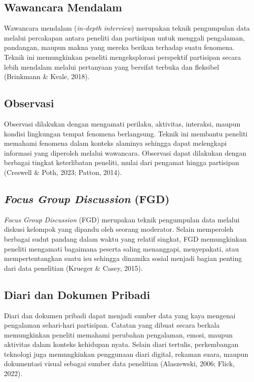 \documentclass[
  indonesian,
  letterpaper,
  DIV=11,
  numbers=noendperiod]{scrreprt}
\begin{document}
\subsection{Wawancara Mendalam}\label{wawancara-mendalam}

Wawancara mendalam (\emph{in-depth interview}) merupakan teknik
pengumpulan data melalui percakapan antara peneliti dan partisipan untuk
menggali pengalaman, pandangan, maupun makna yang mereka berikan
terhadap suatu fenomena. Teknik ini memungkinkan peneliti mengeksplorasi
perspektif partisipan secara lebih mendalam melalui pertanyaan yang
bersifat terbuka dan fleksibel (Brinkmann \& Kvale, 2018).

\subsection{Observasi}\label{observasi}

Observasi dilakukan dengan mengamati perilaku, aktivitas, interaksi,
maupun kondisi lingkungan tempat fenomena berlangsung. Teknik ini
membantu peneliti memahami fenomena dalam konteks alaminya sehingga
dapat melengkapi informasi yang diperoleh melalui wawancara. Observasi
dapat dilakukan dengan berbagai tingkat keterlibatan peneliti, mulai
dari pengamat hingga partisipan (Creswell \& Poth, 2023; Patton, 2014).

\subsection{\texorpdfstring{\emph{Focus Group Discussion}
(FGD)}{Focus Group Discussion (FGD)}}\label{focus-group-discussion-fgd}

\emph{Focus Group Discussion} (FGD) merupakan teknik pengumpulan data
melalui diskusi kelompok yang dipandu oleh seorang moderator. Selain
memperoleh berbagai sudut pandang dalam waktu yang relatif singkat, FGD
memungkinkan peneliti mengamati bagaimana peserta saling menanggapi,
menyepakati, atau mempertentangkan suatu isu sehingga dinamika sosial
menjadi bagian penting dari data penelitian (Krueger \& Casey, 2015).

\subsection{Diari dan Dokumen Pribadi}\label{diari-dan-dokumen-pribadi}

Diari dan dokumen pribadi dapat menjadi sumber data yang kaya mengenai
pengalaman sehari-hari partisipan. Catatan yang dibuat secara berkala
memungkinkan peneliti memahami perubahan pengalaman, emosi, maupun
aktivitas dalam konteks kehidupan nyata. Selain diari tertulis,
perkembangan teknologi juga memungkinkan penggunaan diari digital,
rekaman suara, maupun dokumentasi visual sebagai sumber data penelitian
(Alaszewski, 2006; Flick, 2022).
\end{document}
